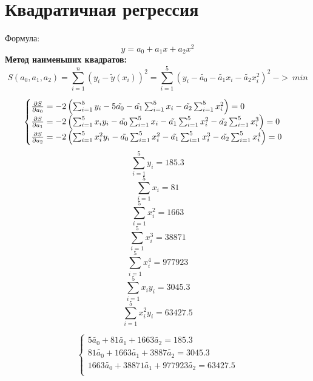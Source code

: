 \documentclass{article}
\begin{document}
\section*{Квадратичная регрессия}
Формула:
\[y = a_0 +a_1x+a_2x^2\]
\textbf{Метод наименьших квадратов:}
\[S(a_0, a_1, a_2) = \sum_{i=1}^{n}(y_i - \tilde{y}(x_i))^2 = \sum_{i=1}^{5}(y_i - \tilde{a_0} - \tilde{a_1}x_i - \tilde{a_2}x_i^2)^2 \ ->\ min\]


\[\begin{cases}
    \pdv{S}{a_0} = -2\left(\sum_{i=1}^{5}y_i - 5\tilde{a_0} - \tilde{a_1}\sum_{i=1}^{5}x_i - \tilde{a_2}\sum_{i=1}^{5}x_i^2\right) = 0\\
    \pdv{S}{a_1} = -2\left(\sum_{i=1}^{5}x_iy_i - \tilde{a_0}\sum_{i=1}^{5}x_i - \tilde{a_1}\sum_{i=1}^{5}x_i^2 - \tilde{a_2}\sum_{i=1}^{5}x_i^3\right) = 0\\
    \pdv{S}{a_2} = -2\left(\sum_{i=1}^{5}x_i^2y_i - \tilde{a_0}\sum_{i=1}^{5}x_i^2 - \tilde{a_1}\sum_{i=1}^{5}x_i^3 - \tilde{a_2}\sum_{i=1}^{5}x_i^4\right) = 0\\
\end{cases}\]
\[\sum_{i=1}^{5}y_i = 185.3\]
\[\sum_{i=1}^{5}x_i = 81\]
\[\sum_{i=1}^{5}x_i^2 = 1663\]
\[\sum_{i=1}^{5}x_i^3 = 38871\]
\[\sum_{i=1}^{5}x_i^4 = 977923\]
\[\sum_{i=1}^{5}x_iy_i = 3045.3\]
\[\sum_{i=1}^{5}x_i^2y_i = 63427.5\]

\[\begin{cases}
     5\tilde{a_0}+81\tilde{a_1}+1663\tilde{a_2} = 185.3\\
     81\tilde{a_0}+1663\tilde{a_1}+3887\tilde{a_2} = 3045.3\\
     1663\tilde{a_0}+38871\tilde{a_1}+977923\tilde{a_2} = 63427.5\\
\end{cases}\]
\end{document}
